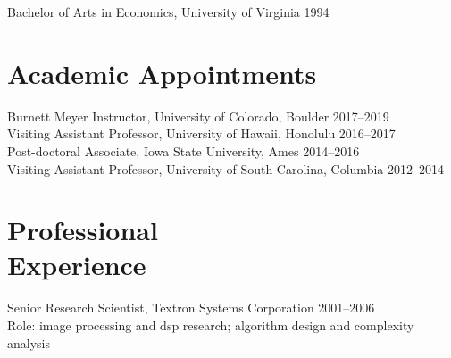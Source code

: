 \documentclass[margin,line]{resume}
\begin{document}
\begin{resume}
    \vspace{-2mm}
    Bachelor of Arts in Economics, University of Virginia \hfill 1994

    \vspace{-1mm}
    \section{\mysidestyle Academic Appointments}
    Burnett Meyer Instructor, University of Colorado, Boulder \hfill  2017--2019 \\[3pt]
    Visiting Assistant Professor, University of Hawaii, Honolulu \hfill  2016--2017 \\[3pt]
    Post-doctoral Associate, Iowa State University, Ames \hfill  2014--2016 \\[3pt]
    Visiting Assistant Professor, University of South Carolina, Columbia \hfill  2012--2014


    \vspace{-1mm}
    \section{\mysidestyle Professional\\Experience}
    
    Senior Research Scientist, Textron Systems Corporation  \hfill 2001--2006\\
    Role: image processing and dsp research; algorithm design and complexity analysis


    

\end{resume}
\end{document}
